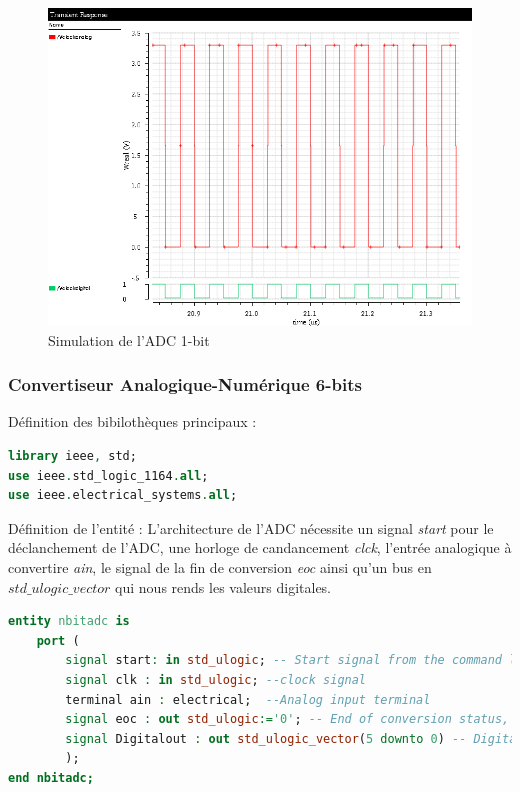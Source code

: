 \documentclass[a4paper]{article}
\begin{document}
\begin{figure}[!htb]
\begin{center}
  \includegraphics[scale=0.50]{1bit-ADC-conversion-sim.png}
  \caption{Simulation de l'ADC 1-bit }
\end{center}
\end{figure}

\clearpage

\subsubsection{Convertiseur Analogique-Num\'erique 6-bits}

D\'efinition des bibiloth\`eques principaux :
\begin{lstlisting}[language=VHDL, belowskip=-0.5 \baselineskip]
library ieee, std;
use ieee.std_logic_1164.all;
use ieee.electrical_systems.all;
\end{lstlisting}

D\'efinition de l'entit\'e : L'architecture de l'ADC n\'ecessite un signal \textit{start} pour
le d\'eclanchement de l'ADC, une horloge de candancement \textit{clck}, l'entr\'ee
analogique \`a convertire \textit{ain}, le signal de la fin de conversion \textit{eoc}
ainsi qu'un bus en $std\_ulogic\_vector$ qui nous rends les valeurs digitales.
\begin{lstlisting}[language=VHDL, belowskip=-0.5 \baselineskip]
entity nbitadc is
	port (
		signal start: in std_ulogic; -- Start signal from the command logic
		signal clk : in std_ulogic; --clock signal
		terminal ain : electrical;  --Analog input terminal
		signal eoc : out std_ulogic:='0'; -- End of conversion status, initialized on default and used by the command logic
		signal Digitalout : out std_ulogic_vector(5 downto 0) -- Digital 6 bits output
		);
end nbitadc;
\end{lstlisting}
\end{document}
